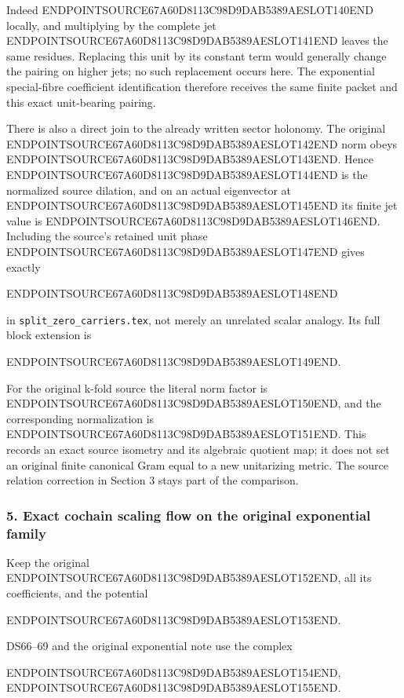 Indeed ENDPOINTSOURCE67A60D8113C98D9DAB5389AESLOT140END locally, and multiplying by the complete jet ENDPOINTSOURCE67A60D8113C98D9DAB5389AESLOT141END leaves the same residues. Replacing this unit by its constant term would generally change the pairing on higher jets; no such replacement occurs here. The exponential special-fibre coefficient identification therefore receives the same finite packet and this exact unit-bearing pairing.

There is also a direct join to the already written sector holonomy. The original ENDPOINTSOURCE67A60D8113C98D9DAB5389AESLOT142END norm obeys ENDPOINTSOURCE67A60D8113C98D9DAB5389AESLOT143END. Hence ENDPOINTSOURCE67A60D8113C98D9DAB5389AESLOT144END is the normalized source dilation, and on an actual eigenvector at ENDPOINTSOURCE67A60D8113C98D9DAB5389AESLOT145END its finite jet value is ENDPOINTSOURCE67A60D8113C98D9DAB5389AESLOT146END. Including the source's retained unit phase ENDPOINTSOURCE67A60D8113C98D9DAB5389AESLOT147END gives exactly

ENDPOINTSOURCE67A60D8113C98D9DAB5389AESLOT148END

in \texttt{split\_zero\_carriers.tex}, not merely an unrelated scalar analogy. Its full block extension is

ENDPOINTSOURCE67A60D8113C98D9DAB5389AESLOT149END.

For the original k-fold source the literal norm factor is ENDPOINTSOURCE67A60D8113C98D9DAB5389AESLOT150END, and the corresponding normalization is ENDPOINTSOURCE67A60D8113C98D9DAB5389AESLOT151END. This records an exact source isometry and its algebraic quotient map; it does not set an original finite canonical Gram equal to a new unitarizing metric. The source relation correction in Section 3 stays part of the comparison.

\subsubsection{5. Exact cochain scaling flow on the original exponential family}\label{endpoint-f1_scaling--exact-cochain-scaling-flow-on-the-original-exponential-family}

Keep the original ENDPOINTSOURCE67A60D8113C98D9DAB5389AESLOT152END, all its coefficients, and the potential

ENDPOINTSOURCE67A60D8113C98D9DAB5389AESLOT153END.

DS66--69 and the original exponential note use the complex

ENDPOINTSOURCE67A60D8113C98D9DAB5389AESLOT154END, ENDPOINTSOURCE67A60D8113C98D9DAB5389AESLOT155END.

